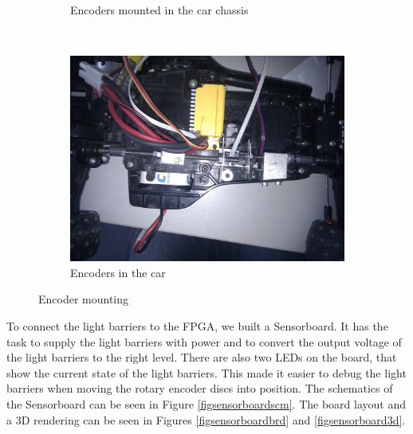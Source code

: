 \documentclass[a4paper
               ,10pt
               ,DIV=10 %
               ,BCOR=0.3cm
               ,pagesize %
               ,headings=small
               ,bibtotoc
               ]
               {scrartcl}
\begin{document}
\begin{figure}[H]
\begin{subfigure}[b]{0.3\textwidth}
  \caption{Encoders mounted in the car chassis}
  \label{figencmount2}
  \end{subfigure}~
  \begin{subfigure}[b]{0.3\textwidth}
  \centering
  \includegraphics[width=\textwidth]{pic/encoders_top.jpg}
  \caption{Encoders in the car}
  \label{figencmount3}
  \end{subfigure}
  \caption{Encoder mounting}
  \label{figenc}
\end{figure}


To connect the light barriers to the FPGA, we built a Sensorboard. It has the task to supply the light barriers with power and to convert the output voltage of the light barriers to the right level.
There are also two LEDs on the board, that show the current state of the light barriers.
This made it easier to debug the light barriers when moving the rotary encoder discs into position.
The schematics of the Sensorboard can be seen in Figure \ref{figsensorboardscm}. The board layout and a 3D rendering can be seen in Figures \ref{figsensorboardbrd} and \ref{figsensorboard3d}.
\end{document}
